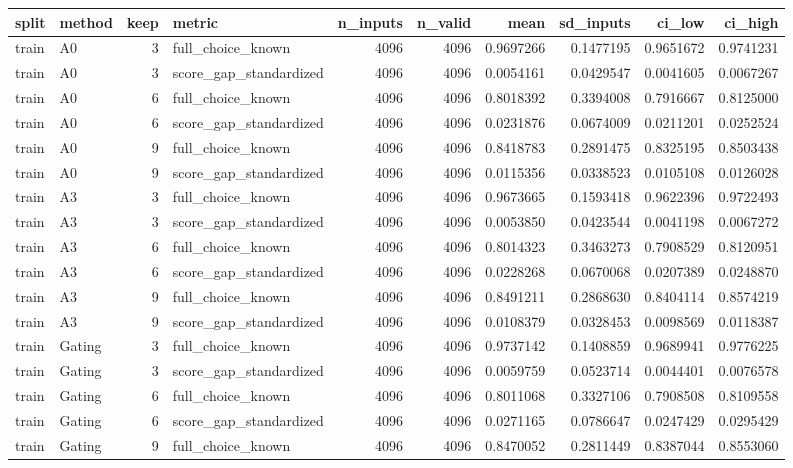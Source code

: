 \begin{tabular}{llrlrrrrrr}
\toprule
split & method & keep & metric & n_inputs & n_valid & mean & sd_inputs & ci_low & ci_high \\
\midrule
train & A0 & 3 & full_choice_known & 4096 & 4096 & 0.9697266 & 0.1477195 & 0.9651672 & 0.9741231 \\
train & A0 & 3 & score_gap_standardized & 4096 & 4096 & 0.0054161 & 0.0429547 & 0.0041605 & 0.0067267 \\
train & A0 & 6 & full_choice_known & 4096 & 4096 & 0.8018392 & 0.3394008 & 0.7916667 & 0.8125000 \\
train & A0 & 6 & score_gap_standardized & 4096 & 4096 & 0.0231876 & 0.0674009 & 0.0211201 & 0.0252524 \\
train & A0 & 9 & full_choice_known & 4096 & 4096 & 0.8418783 & 0.2891475 & 0.8325195 & 0.8503438 \\
train & A0 & 9 & score_gap_standardized & 4096 & 4096 & 0.0115356 & 0.0338523 & 0.0105108 & 0.0126028 \\
train & A3 & 3 & full_choice_known & 4096 & 4096 & 0.9673665 & 0.1593418 & 0.9622396 & 0.9722493 \\
train & A3 & 3 & score_gap_standardized & 4096 & 4096 & 0.0053850 & 0.0423544 & 0.0041198 & 0.0067272 \\
train & A3 & 6 & full_choice_known & 4096 & 4096 & 0.8014323 & 0.3463273 & 0.7908529 & 0.8120951 \\
train & A3 & 6 & score_gap_standardized & 4096 & 4096 & 0.0228268 & 0.0670068 & 0.0207389 & 0.0248870 \\
train & A3 & 9 & full_choice_known & 4096 & 4096 & 0.8491211 & 0.2868630 & 0.8404114 & 0.8574219 \\
train & A3 & 9 & score_gap_standardized & 4096 & 4096 & 0.0108379 & 0.0328453 & 0.0098569 & 0.0118387 \\
train & Gating & 3 & full_choice_known & 4096 & 4096 & 0.9737142 & 0.1408859 & 0.9689941 & 0.9776225 \\
train & Gating & 3 & score_gap_standardized & 4096 & 4096 & 0.0059759 & 0.0523714 & 0.0044401 & 0.0076578 \\
train & Gating & 6 & full_choice_known & 4096 & 4096 & 0.8011068 & 0.3327106 & 0.7908508 & 0.8109558 \\
train & Gating & 6 & score_gap_standardized & 4096 & 4096 & 0.0271165 & 0.0786647 & 0.0247429 & 0.0295429 \\
train & Gating & 9 & full_choice_known & 4096 & 4096 & 0.8470052 & 0.2811449 & 0.8387044 & 0.8553060 \\

\end{tabular}
